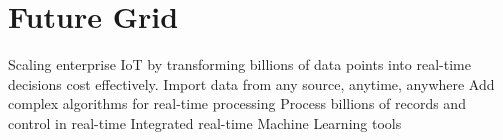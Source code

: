 \section{Future Grid}
Scaling enterprise IoT by transforming billions of data points into real-time
decisions cost effectively.\cite{www-futuregrid}
Import data from any source, anytime, anywhere
Add complex algorithms for real-time processing
Process billions of records and control in real-time
Integrated real-time Machine Learning tools
